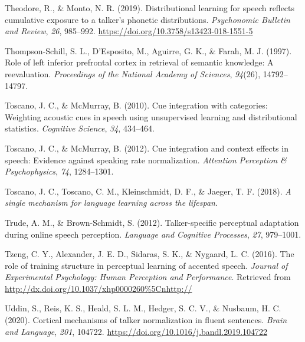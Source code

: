 \documentclass[
  11pt,
  english,
  man,floatsintext]{apa6}
\newlength{\cslhangindent}
\newlength{\cslentryspacingunit} %
\newenvironment{CSLReferences}[2] %
 {%
  \setlength{\parindent}{0pt}
  \ifodd #1
  \let\oldpar\par
  \def\par{\hangindent=\cslhangindent\oldpar}
  \fi
  \setlength{\parskip}{#2\cslentryspacingunit}
 }%
 {}
\begin{document}
\begin{CSLReferences}{1}{0}
\leavevmode{}%
Theodore, R., \& Monto, N. R. (2019). Distributional learning for speech reflects cumulative exposure to a talker's phonetic distributions. \emph{Psychonomic Bulletin and Review}, \emph{26}, 985--992. \url{https://doi.org/10.3758/s13423-018-1551-5}

\leavevmode{}%
Thompson-Schill, S. L., D'Esposito, M., Aguirre, G. K., \& Farah, M. J. (1997). Role of left inferior prefrontal cortex in retrieval of semantic knowledge: A reevaluation. \emph{Proceedings of the National Academy of Sciences}, \emph{94}(26), 14792--14797.

\leavevmode{}%
Toscano, J. C., \& McMurray, B. (2010). Cue integration with categories: Weighting acoustic cues in speech using unsupervised learning and distributional statistics. \emph{Cognitive Science}, \emph{34}, 434--464.

\leavevmode{}%
Toscano, J. C., \& McMurray, B. (2012). Cue integration and context effects in speech: Evidence against speaking rate normalization. \emph{Attention Perception \& Psychophysics}, \emph{74}, 1284--1301.

\leavevmode{}%
Toscano, J. C., Toscano, C. M., Kleinschmidt, D. F., \& Jaeger, T. F. (2018). \emph{A single mechanism for language learning across the lifespan}.

\leavevmode{}%
Trude, A. M., \& Brown-Schmidt, S. (2012). Talker-specific perceptual adaptation during online speech perception. \emph{Language and Cognitive Processes}, \emph{27}, 979--1001.

\leavevmode{}%
Tzeng, C. Y., Alexander, J. E. D., Sidaras, S. K., \& Nygaard, L. C. (2016). The role of training structure in perceptual learning of accented speech. \emph{Journal of Experimental Psychology: Human Perception and Performance}. Retrieved from \url{http://dx.doi.org/10.1037/xhp0000260\%5Cnhttp://}

\leavevmode{}%
Uddin, S., Reis, K. S., Heald, S. L. M., Hedger, S. C. V., \& Nusbaum, H. C. (2020). Cortical mechanisms of talker normalization in fluent sentences. \emph{Brain and Language}, \emph{201}, 104722. \url{https://doi.org/10.1016/j.bandl.2019.104722}


\end{CSLReferences}
\end{document}
